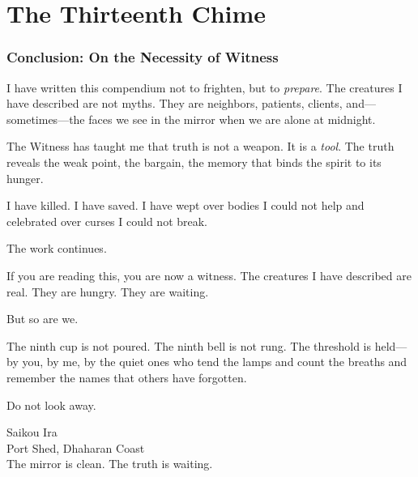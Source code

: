 
\clearpage
\part{The Thirteenth Chime}

\section{Conclusion: On the Necessity of Witness}

I have written this compendium not to frighten, but to \emph{prepare}. The creatures I have described are not myths. They are neighbors, patients, clients, and---sometimes---the faces we see in the mirror when we are alone at midnight.

The Witness has taught me that truth is not a weapon. It is a \emph{tool}. The truth reveals the weak point, the bargain, the memory that binds the spirit to its hunger.

I have killed. I have saved. I have wept over bodies I could not help and celebrated over curses I could not break.

The work continues.

If you are reading this, you are now a witness. The creatures I have described are real. They are hungry. They are waiting.

But so are we.

The ninth cup is not poured. The ninth bell is not rung. The threshold is held---by you, by me, by the quiet ones who tend the lamps and count the breaths and remember the names that others have forgotten.

Do not look away.

\begin{flushright}
Saikou Ira\\
Port Shed, Dhaharan Coast\\
The mirror is clean. The truth is waiting.
\end{flushright}

